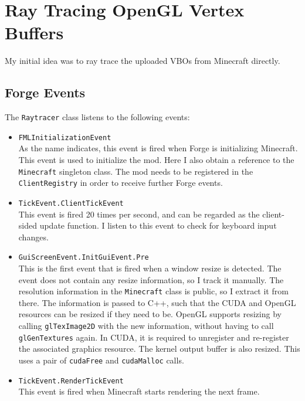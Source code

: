 \documentclass[]{article}
\begin{document}
\section{Ray Tracing OpenGL Vertex Buffers}
My initial idea was to ray trace the uploaded VBOs from Minecraft directly.

\subsection{Forge Events}
The \texttt{Raytracer} class listens to the following events:
\begin{itemize}
  \item \texttt{FMLInitializationEvent} \\
    As the name indicates, this event is fired when Forge is initializing Minecraft.
    This event is used to initialize the mod.
    Here I also obtain a reference to the \texttt{Minecraft} singleton class.
    The mod needs to be registered in the \texttt{ClientRegistry} in order to receive further Forge events.
  \item \texttt{TickEvent.ClientTickEvent} \\
    This event is fired 20 times per second, and can be regarded as the client-sided update function.
    I listen to this event to check for keyboard input changes.
  \item \texttt{GuiScreenEvent.InitGuiEvent.Pre} \\
    This is the first event that is fired when a window resize is detected.
    The event does not contain any resize information, so I track it manually.
    The resolution information in the \texttt{Minecraft} class is public, so I extract it from there.
    The information is passed to C++, such that the CUDA and OpenGL resources can be resized if they need to be.
    OpenGL supports resizing by calling \texttt{glTexImage2D} with the new information, without having to call \texttt{glGenTextures} again.
    In CUDA, it is required to unregister and re-register the associated graphics resource.
    The kernel output buffer is also resized. This uses a pair of \texttt{cudaFree} and \texttt{cudaMalloc} calls.

  \item \texttt{TickEvent.RenderTickEvent} \\
    This event is fired when Minecraft starts rendering the next frame.
    

\end{itemize}
\end{document}
